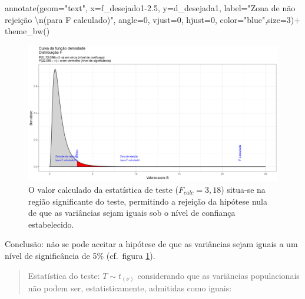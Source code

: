 \documentclass[
]{book}
\newenvironment{Shaded}{\begin{snugshade}}{\end{snugshade}}
\newcommand{\AttributeTok}[1]{\textcolor[rgb]{0.77,0.63,0.00}{#1}}
\newcommand{\DecValTok}[1]{\textcolor[rgb]{0.00,0.00,0.81}{#1}}
\newcommand{\FloatTok}[1]{\textcolor[rgb]{0.00,0.00,0.81}{#1}}
\newcommand{\FunctionTok}[1]{\textcolor[rgb]{0.00,0.00,0.00}{#1}}
\newcommand{\NormalTok}[1]{#1}
\newcommand{\SpecialCharTok}[1]{\textcolor[rgb]{0.00,0.00,0.00}{#1}}
\newcommand{\StringTok}[1]{\textcolor[rgb]{0.31,0.60,0.02}{#1}}
\begin{document}
\begin{Shaded}
\begin{Highlighting}[]
  \FunctionTok{annotate}\NormalTok{(}\AttributeTok{geom=}\StringTok{"text"}\NormalTok{, }\AttributeTok{x=}\NormalTok{f\_desejado1}\FloatTok{{-}2.5}\NormalTok{, }\AttributeTok{y=}\NormalTok{d\_desejada1, }\AttributeTok{label=}\StringTok{"Zona de não rejeição  }\SpecialCharTok{\textbackslash{}n}\StringTok{(para F calculado)"}\NormalTok{, }\AttributeTok{angle=}\DecValTok{0}\NormalTok{, }\AttributeTok{vjust=}\DecValTok{0}\NormalTok{, }\AttributeTok{hjust=}\DecValTok{0}\NormalTok{, }\AttributeTok{color=}\StringTok{"blue"}\NormalTok{,}\AttributeTok{size=}\DecValTok{3}\NormalTok{)}\SpecialCharTok{+}
  \FunctionTok{theme\_bw}\NormalTok{()}
\end{Highlighting}
\end{Shaded}

\hfill\break

\begin{figure}

{\centering \includegraphics[width=1\linewidth]{images11/f_test_4} 

}

\caption{O valor calculado da estatística de teste ($F_{calc}=3,18$) situa-se na região significante do teste, permitindo a rejeição da hipótese nula de que as variâncias sejam iguais sob o nível de confiança estabelecido.}\label{fig:fig90}
\end{figure}

\hfill\break

Conclusão: não se pode aceitar a hipótese de que as variâncias sejam iguais a um nível de significância de 5\% (cf.~figura \ref{fig:fig90}).

\begin{quote}
Estatística do teste: \(T \sim t_{(\nu)}\) considerando que as variãncias populacionais não podem ser, estatisticamente, admitidas como iguais:
\end{quote}
\end{document}
